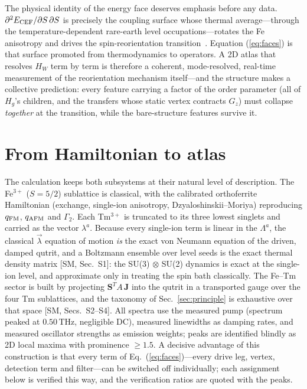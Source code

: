 \documentclass[aps,prb,twocolumn,superscriptaddress,longbibliography]{revtex4-2}
\newcommand{\ve}[1]{\boldsymbol{#1}}
\newcommand{\qafm}{q_{\rm AFM}}
\newcommand{\qfm}{q_{\rm FM}}
\begin{document}
The physical identity of the energy face deserves emphasis before any
data.  $\partial^2E_{\rm CEF}/\partial S\,\partial S$ is precisely
the coupling surface whose thermal average---through the
temperature-dependent rare-earth level occupations---rotates the Fe
anisotropy and drives the spin-reorientation
transition~\cite{Yamaguchi,Schlauderer2019}.  Equation
(\ref{eq:faces}) is that surface promoted from thermodynamics to
operators.  A 2D atlas that resolves $H_W$ term by term is therefore
a coherent, mode-resolved, real-time measurement of the reorientation
mechanism itself---and the structure makes a collective prediction:
every feature carrying a factor of the order parameter (all of
$H_g$'s children, and the transfers whose static vertex contracts
$G_z$) must collapse \emph{together} at the transition, while the
bare-structure features survive it.

\section{From Hamiltonian to atlas}

The calculation keeps both subsystems at their natural level of
description.  The Fe$^{3+}$ ($S=5/2$) sublattice is classical, with
the calibrated orthoferrite Hamiltonian (exchange, single-ion
anisotropy, Dzyaloshinskii--Moriya) reproducing $\qfm$, $\qafm$ and
$\Gamma_2$.  Each Tm$^{3+}$ is truncated to its three lowest singlets
and carried as the vector $\lambda^a$.  Because every single-ion term
is linear in the $\Lambda^a$, the classical $\vec\lambda$ equation of
motion \emph{is} the exact von Neumann equation of the driven, damped
qutrit, and a Boltzmann ensemble over level seeds is the exact
thermal density matrix [SM, Sec.~S1]: the SU(3)$\,\otimes\,$SU(2)
dynamics is exact at the single-ion level, and approximate only in
treating the spin bath classically.  The Fe--Tm sector is built by
projecting $\ve S^{T}\!A\,\ve J$ into the qutrit in a transported
gauge over the four Tm sublattices, and the taxonomy of
Sec.~\ref{sec:principle} is exhaustive over that space [SM,
Secs.~S2--S4].  All spectra use the measured pump (spectrum peaked at
$0.50$\,THz, negligible DC), measured linewidths as damping rates, and
measured oscillator strengths as emission weights; peaks are
identified blindly as 2D local maxima with prominence $\geq1.5$.  A
decisive advantage of this construction is that every term of
Eq.~(\ref{eq:faces})---every drive leg, vertex, detection term and
filter---can be switched off individually; each assignment below is
verified this way, and the verification ratios are quoted with the
peaks.
\end{document}
